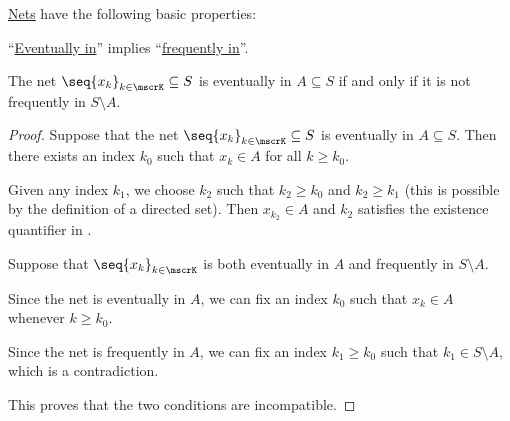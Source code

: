\begin{proposition}\label{thm:def:topological_net}
  \hyperref[def:topological_net]{Nets} have the following basic properties:

  \begin{thmenum}
     \enquote{\hyperref[def:topological_net/eventually_in]{Eventually in}} implies \enquote{\hyperref[def:topological_net/frequently_in]{frequently in}}.

     The net \( \seq{ x_k }_{k \in \mscrK} \subseteq S \) is eventually in \( A \subseteq S \) if and only if it is not frequently in \( S \setminus A \).
  \end{thmenum}
\end{proposition}
\begin{proof}
   Suppose that the net \( \seq{ x_k }_{k \in \mscrK} \subseteq S \) is eventually in \( A \subseteq S \). Then there exists an index \( k_0 \) such that \( x_k \in A \) for all \( k \geq k_0 \).

  Given any index \( k_1 \), we choose \( k_2 \) such that \( k_2 \geq k_0 \) and \( k_2 \geq k_1 \) (this is possible by the definition of a directed set). Then \( x_{k_2} \in A \) and \( k_2 \) satisfies the existence quantifier in .

   Suppose that \( \seq{ x_k }_{k \in \mscrK} \) is both eventually in \( A \) and frequently in \( S \setminus A \).

  Since the net is eventually in \( A \), we can fix an index \( k_0 \) such that \( x_k \in A \) whenever \( k \geq k_0 \).

  Since the net is frequently in \( A \), we can fix an index \( k_1 \geq k_0 \) such that \( k_1 \in S \setminus A \), which is a contradiction.

  This proves that the two conditions are incompatible.
\end{proof}

